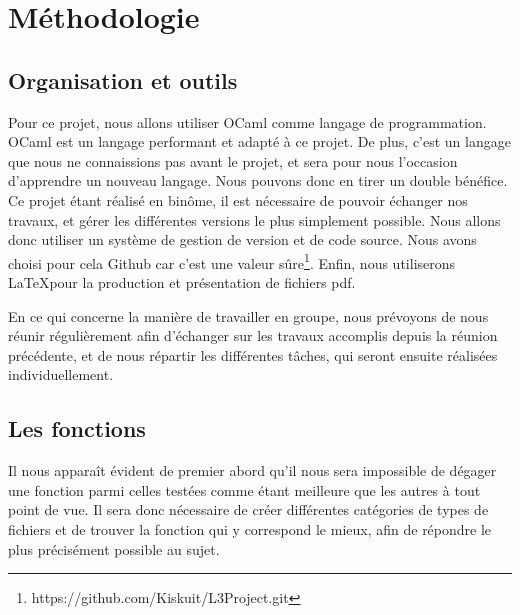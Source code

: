 \documentclass[final,twoside,article,10pt]{scrartcl}
\begin{document}
	
\section{Méthodologie}
	\subsection{Organisation et outils}
		Pour ce projet, nous allons utiliser OCaml comme langage de programmation. OCaml est un langage performant et 	adapté à ce projet. De plus, c'est un langage que nous ne connaissions pas avant le projet, et sera pour nous l'occasion d'apprendre un nouveau langage. Nous pouvons donc en tirer un double bénéfice.
	Ce projet étant réalisé en binôme, il est nécessaire de pouvoir échanger nos travaux, et gérer les différentes versions le plus simplement possible. Nous allons donc utiliser un système de gestion de version et de code source. Nous avons choisi pour cela Github car c'est une valeur sûre\footnote{https://github.com/Kiskuit/L3Project.git}. Enfin, nous utiliserons \LaTeX pour la production et présentation de fichiers pdf.\\
	\par En ce qui concerne la manière de travailler en groupe, nous prévoyons de nous réunir régulièrement afin d'échanger sur les travaux accomplis depuis la réunion précédente, et de nous répartir les différentes tâches, qui seront ensuite réalisées individuellement.
		
	\subsection{Les fonctions}
		Il nous apparaît évident de premier abord qu'il nous sera impossible de dégager une fonction parmi celles testées comme étant meilleure que les autres à tout point de vue. Il sera donc nécessaire de créer différentes catégories de types de fichiers et de trouver la fonction qui y correspond le mieux, afin de répondre le plus précisément possible au sujet.
		
\end{document}
